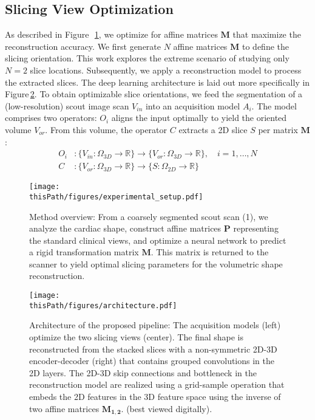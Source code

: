    \subsection{Slicing View Optimization}
    As described in Figure~\,\ref{fig:method_overview}, we optimize for affine matrices $\mathbf{M}$ that maximize the reconstruction accuracy.
    We first generate $N$ affine matrices $\mathbf{M}$ to define the slicing orientation. This work explores the extreme scenario of studying only $N=2$ slice locations. Subsequently, we apply a reconstruction model to process the extracted slices.
    The deep learning architecture is laid out more specifically in Figure\,\ref{fig:architecture}.
    To obtain optimizable slice orientations, we feed the segmentation of a (low-resolution) scout image scan $V_{in}$ into an acquisition model $A_i$. The model comprises two operators: $O_i$ aligns the input optimally to yield the oriented volume $V_{or}$.  From this volume, the operator $C$ extracts a 2D slice $S$ per matrix $\mathbf{M}$:
    \begin{align}
        O_i&: \{ V_{in}:\Omega_{3D} \rightarrow \mathbb{R}\} \rightarrow \{ V_{or}: \Omega_{3D} \rightarrow \mathbb{R}\}, \quad i = 1,\dots,N \label{eq:orientation} \\
        C&: \{ V_{or}:\Omega_{3D} \rightarrow \mathbb{R}\} \rightarrow \{ S: \Omega_{2D} \rightarrow \mathbb{R}\} \label{eq:slicing}
    \end{align}

    \begin{figure}
        \texttt{[image: \\thisPath/figures/experimental\_setup.pdf]}
        \caption{
        Method overview: From a coarsely segmented scout scan (1), we analyze the cardiac shape, construct affine matrices $\mathbf{P}$ representing the standard clinical views, and optimize a neural network to predict a rigid transformation matrix $\mathbf{M}$. This matrix is returned to the scanner to yield optimal slicing parameters for the volumetric shape reconstruction. }
        \label{fig:method_overview}
    \end{figure}

    \begin{figure}
        \texttt{[image: \\thisPath/figures/architecture.pdf]}
        \caption{Architecture of the proposed pipeline: The acquisition models (left) optimize the two slicing views (center). The final shape is reconstructed from the stacked slices with a non-symmetric 2D-3D encoder-decoder (right) that contains grouped convolutions in the 2D layers. The 2D-3D skip connections and bottleneck in the reconstruction model are realized using a grid-sample operation that embeds the 2D features in the 3D feature space using the inverse of two affine matrices $\mathbf{M_{1,2}}$. (best viewed digitally).}
    \label{fig:architecture}
    \end{figure}

